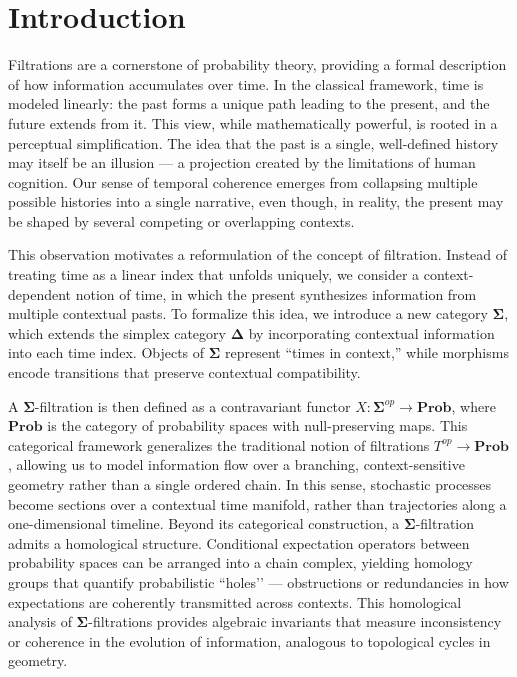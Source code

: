 \documentclass[12pt, a4paper]{amsart}
\theoremstyle{plain}
\theoremstyle{definition}
\numberwithin{figure}{section}
\numberwithin{table}{section}
\numberwithin{equation}{section}
\newcommand{\Prob}{\mathbf{Prob}}
\newcommand{\bDelta}{\mathbf{\Delta}}
\newcommand{\bSigma}{\mathbf{\Sigma}}
\begin{document}
\section{Introduction}
\label{sec:introduction}
Filtrations are a cornerstone of probability theory, 
providing a formal description of how information accumulates over time. 
In the classical framework, 
time is modeled linearly: 
the past forms a unique path leading to the present, 
and the future extends from it. 
This view, while mathematically powerful, is rooted in a perceptual simplification. 
The idea that the past is a single, 
well-defined history may itself be an illusion — 
a projection created by the limitations of human cognition. 
Our sense of temporal coherence emerges from collapsing multiple possible histories 
into a single narrative, 
even though, in reality, the present may be shaped by several competing or overlapping contexts.

This observation motivates a reformulation of the concept of filtration. 
Instead of treating time as a linear index that unfolds uniquely, 
we consider a context-dependent notion of time, 
in which the present synthesizes information from multiple contextual pasts. 
To formalize this idea, 
we introduce a new category $\bSigma$, 
which extends the simplex category $\bDelta$ 
by incorporating contextual information into each time index. 
Objects of $\bSigma$ represent “times in context,” 
while morphisms encode transitions that preserve contextual compatibility.

A $\bSigma$-filtration is then defined as a contravariant functor
$
X : \bSigma^{op} \to \Prob 
$,
where $\Prob$ is the category of probability spaces with null-preserving maps. 
This categorical framework generalizes the traditional notion of filtrations 
$
T^{op} \to \Prob
$,
allowing us to model information flow over a branching, context-sensitive geometry 
rather than a single ordered chain. 
In this sense, 
stochastic processes become sections over a contextual time manifold, 
rather than trajectories along a one-dimensional timeline.
Beyond its categorical construction, 
a $\bSigma$-filtration admits a homological structure. 
Conditional expectation operators between probability spaces 
can be arranged into a chain complex, 
yielding homology groups 
that quantify probabilistic ``holes’’ — obstructions or redundancies 
in how expectations are coherently transmitted across contexts. 
This homological analysis of $\bSigma$-filtrations provides algebraic invariants 
that measure inconsistency or coherence in the evolution of information, 
analogous to topological cycles in geometry.
\end{document}
